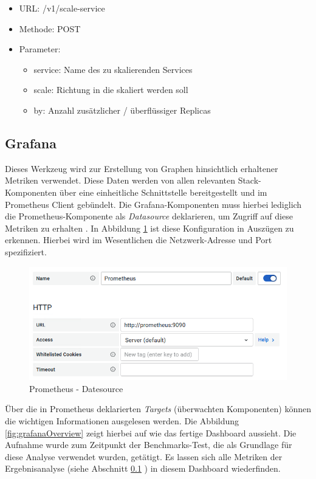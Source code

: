 \begin{itemize}
  \item URL: /v1/scale-service
  \item Methode: POST
  \item Parameter:
  \begin{itemize}
    \item service: Name des zu skalierenden Services
    \item scale: Richtung in die skaliert werden soll 
    \item by: Anzahl zusätzlicher / überflüssiger Replicas
  \end{itemize}
\end{itemize}

\subsection{Grafana \checkmark}

Dieses Werkzeug wird zur Erstellung von Graphen hinsichtlich erhaltener Metriken verwendet. Diese Daten werden von allen relevanten Stack-Komponenten über eine einheitliche Schnittstelle bereitgestellt und im Prometheus Client gebündelt. Die Grafana-Komponenten muss hierbei lediglich die Prometheus-Komponente als \emph{Datasource} deklarieren, um Zugriff auf diese Metriken zu erhalten \cite[Seite~99 ff.]{oreillyPrometheus}. In Abbildung \ref{fig:prometheusDatasource} ist diese Konfiguration in Auszügen zu erkennen. Hierbei wird im Wesentlichen die Netzwerk-Adresse und Port spezifiziert. 

\begin{figure}[ht!]
	\centering
	\includegraphics[width=.9\linewidth]{kapitel/problemloesung/implementierung/_img/prometheus-datasource}
	\caption[Prometheus - Datesource]{Prometheus - Datesource}
	\label{fig:prometheusDatasource}
\end{figure}

Über die in Prometheus deklarierten \emph{Targets} (überwachten Komponenten) können die wichtigen Informationen ausgelesen werden. Die Abbildung \ref{fig:grafanaOverview} zeigt hierbei auf wie das fertige Dashboard aussieht. Die Aufnahme wurde zum Zeitpunkt der Benchmarks-Test, die als Grundlage für diese Analyse verwendet wurden, getätigt. Es lassen sich alle Metriken der Ergebnisanalyse (siehe Abschnitt \ref{} ) in diesem Dashboard wiederfinden. 

